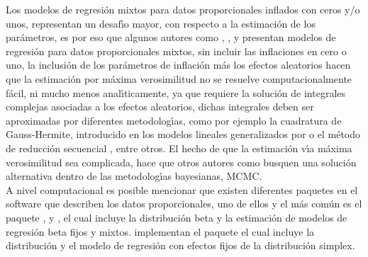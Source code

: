 Los modelos de regresi\'{o}n mixtos para datos proporcionales inflados con ceros y/o unos, re\-pre\-sen\-tan un desaf\'{\i}o mayor, con respecto a la estimaci\'{o}n de los par\'{a}metros, es por eso que algunos autores como \cite{Usuga1}, \cite{Bonat2}, \cite{Song1} y \cite{Stasinopoulos2} presentan modelos de regresi\'{o}n para datos proporcionales mixtos, sin incluir las inflaciones en cero o uno, la inclusi\'{o}n de los par\'{a}metros de inflaci\'{o}n m\'{a}s los efectos aleatorios hacen que la estimaci\'{o}n por m\'{a}xima verosimilitud no se resuelve computacionalmente f\'{a}cil, ni mucho menos anal\'{\i}ticamente, ya que requiere la soluci\'{o}n de integrales complejas asociadas a los efectos aleatorios, dichas integrales deben ser aproximadas por diferentes metodolog\'{\i}as, como por ejemplo la cuadratura de Gauss-Hermite, introducido en los modelos lineales generalizados por \cite{Fahrmeir1} o el m\'{e}todo de reducci\'{o}n secuencial \citep{Ogden1}, entre otros. El hecho de que la estimaci\'{o}n v\'{\i}a m\'{a}xima verosimilitud sea complicada, hace que otros autores como \cite{Galvis1} busquen una soluci\'{o}n alternativa dentro de las metodolog\'{\i}as bayesianas, MCMC.\\

A nivel computacional es posible mencionar que existen diferentes paquetes en el software  que describen los datos proporcionales, uno de ellos y el m\'{a}s com\'{u}n es el paquete  \citep{Zeileis1}, \citep{Ferrari1} y \citep{Simas1}, el cual incluye la distribuci\'{o}n beta y la estimaci\'{o}n de modelos de regresi\'{o}n beta fijos y mixtos. \cite{Qiu1} implementan el paquete  el cual incluye la distribuci\'{o}n y el modelo de regresi\'{o}n con efectos fijos de la distribuci\'{o}n simplex.\\

